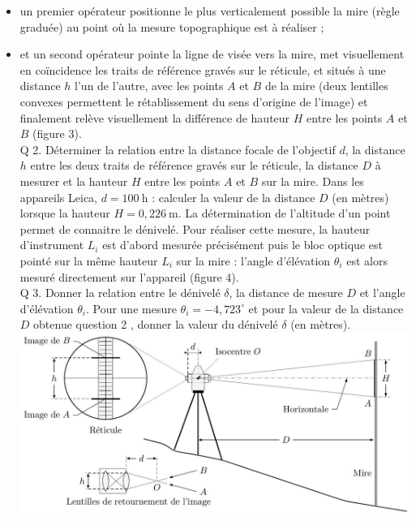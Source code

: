 \documentclass[10pt]{article}
\begin{document}
\begin{itemize}
  \item un premier opérateur positionne le plus verticalement possible la mire (règle graduée) au point où la mesure topographique est à réaliser ;
  \item et un second opérateur pointe la ligne de visée vers la mire, met visuellement en coïncidence les traits de référence gravés sur le réticule, et situés à une distance $h$ l'un de l'autre, avec les points $A$ et $B$ de la mire (deux lentilles convexes permettent le rétablissement du sens d'origine de l'image) et finalement relève visuellement la différence de hauteur $H$ entre les points $A$ et $B$ (figure 3).\\
Q 2. Déterminer la relation entre la distance focale de l'objectif $d$, la distance $h$ entre les deux traits de référence gravés sur le réticule, la distance $D$ à mesurer et la hauteur $H$ entre les points $A$ et $B$ sur la mire. Dans les appareils Leica, $d=100 \mathrm{~h}$ : calculer la valeur de la distance $D$ (en mètres) lorsque la hauteur $H=0,226 \mathrm{~m}$. La détermination de l'altitude d'un point permet de connaitre le dénivelé. Pour réaliser cette mesure, la hauteur d'instrument $L_{i}$ est d'abord mesurée précisément puis le bloc optique est pointé sur la même hauteur $L_{i}$ sur la mire : l'angle d'élévation $\theta_{i}$ est alors mesuré directement sur l'appareil (figure 4).\\
Q 3. Donner la relation entre le dénivelé $\delta$, la distance de mesure $D$ et l'angle d'élévation $\theta_{i}$. Pour une mesure $\theta_{i}=-4,723^{\circ}$ et pour la valeur de la distance $D$ obtenue question 2 , donner la valeur du dénivelé $\delta$ (en mètres).\\
\includegraphics[max width=\textwidth, center]{2024_12_07_51b7f57c7f055c2d8d29g-03(1)}
\end{itemize}
\end{document}
